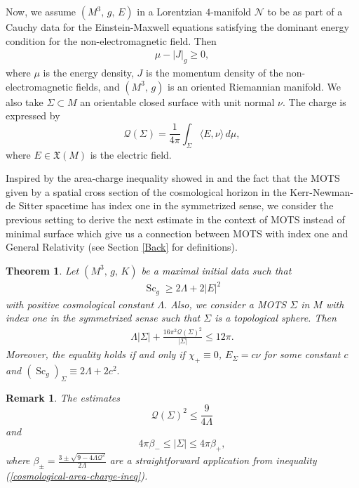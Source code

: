 \documentclass[a4paper, 11pt, reqno]{amsart}
\newcommand{\s}{\operatorname{Sc}}
\newtheorem{theo}{Theorem}[]
\newtheorem{remark}{Remark}
\begin{document}
Now, we assume $(M^3,\,g,\,E)$ in a Lorentzian $4$-manifold $\mathcal{N}$ to be as part of a Cauchy data for the Einstein-Maxwell equations satisfying the dominant energy condition for the non-electromagnetic field. Then
\begin{eqnarray*}
\mu-|J|_g\geq 0,
\end{eqnarray*}
where $\mu$ is the energy density, $J$ is the momentum density of the non-electromagnetic
fields, and $(M^3,\,g)$ is an oriented Riemannian manifold.
We also take $\Sigma\subset M$ an orientable closed surface with unit normal $\nu$. The charge is expressed by 
\begin{equation}\label{charge expression}
    \mathcal{Q}(\Sigma)=\frac{1}{4\pi}\int_{\Sigma}\langle E, \nu\rangle\,d\mu,
\end{equation}
where $E\in\mathfrak{X}(M)$ is the electric field.

Inspired by the area-charge inequality showed in \cite{CLS} and the fact that the MOTS given by a spatial cross section of the cosmological horizon in the Kerr-Newman-de Sitter spacetime has index one in the symmetrized sense, we consider the previous setting to derive the next estimate in the context of MOTS instead of minimal surface which give us a connection between MOTS with index one and General Relativity (see Section \ref{Back} for definitions).
\begin{theo}\label{area-charge-result}
    Let $(M^3,\,g,\,K)$ be a maximal initial data such that
     \begin{eqnarray*}
\s_g\geq 2\Lambda+2|E|^2
\end{eqnarray*}
with positive cosmological constant $\Lambda$. Also, we consider a MOTS $\Sigma$ in $M$ with index one in the symmetrized sense such that $\Sigma$ is a topological sphere. Then
\begin{eqnarray}\label{cosmological-area-charge-ineq}
    \Lambda |\Sigma| +\frac{16\pi^2\mathcal{Q}(\Sigma)^2}{|\Sigma|}\leq 12\pi.
\end{eqnarray}
Moreover, the equality holds if and only if $ \chi_+\equiv0$, $E_{\Sigma}=c\nu$ for some constant $c$ and $(\s_g)_{\Sigma}\equiv 2\Lambda+2c^2.$
\end{theo}
\begin{remark}
    The estimates
\begin{equation*}
    \mathcal{Q}(\Sigma)^2\leq\frac{9}{4\Lambda}
\end{equation*}
and
\begin{equation*}
    4\pi\beta_{-}\leq |\Sigma|\leq 4\pi\beta_{+},
\end{equation*}
where $\beta_{\pm}=\frac{3\pm\sqrt{9-4\Lambda\mathcal{Q}^2}}{2\Lambda}$ are a straightforward application from inequality (\ref{cosmological-area-charge-ineq}).
\end{remark}
\end{document}
